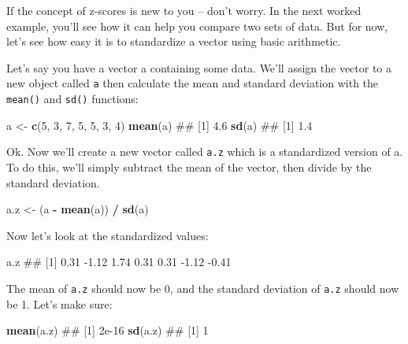 \documentclass[]{book}
\newenvironment{Shaded}{\begin{snugshade}}{\end{snugshade}}
\newcommand{\KeywordTok}[1]{\textcolor[rgb]{0.13,0.29,0.53}{\textbf{#1}}}
\newcommand{\DecValTok}[1]{\textcolor[rgb]{0.00,0.00,0.81}{#1}}
\newcommand{\StringTok}[1]{\textcolor[rgb]{0.31,0.60,0.02}{#1}}
\newcommand{\OperatorTok}[1]{\textcolor[rgb]{0.81,0.36,0.00}{\textbf{#1}}}
\newcommand{\NormalTok}[1]{#1}
\theoremstyle{definition}
\theoremstyle{definition}
\theoremstyle{remark}
\begin{document}
If the concept of z-scores is new to you -- don't worry. In the next
worked example, you'll see how it can help you compare two sets of data.
But for now, let's see how easy it is to standardize a vector using
basic arithmetic.

Let's say you have a vector a containing some data. We'll assign the
vector to a new object called \texttt{a} then calculate the mean and
standard deviation with the \texttt{mean()} and \texttt{sd()} functions:

\begin{Shaded}
\begin{Highlighting}[]
\NormalTok{a <-}\StringTok{ }\KeywordTok{c}\NormalTok{(}\DecValTok{5}\NormalTok{, }\DecValTok{3}\NormalTok{, }\DecValTok{7}\NormalTok{, }\DecValTok{5}\NormalTok{, }\DecValTok{5}\NormalTok{, }\DecValTok{3}\NormalTok{, }\DecValTok{4}\NormalTok{)}
\KeywordTok{mean}\NormalTok{(a)}
\NormalTok{## [1] 4.6}
\KeywordTok{sd}\NormalTok{(a)}
\NormalTok{## [1] 1.4}
\end{Highlighting}
\end{Shaded}

Ok. Now we'll create a new vector called \texttt{a.z} which is a
standardized version of a. To do this, we'll simply subtract the mean of
the vector, then divide by the standard deviation.

\begin{Shaded}
\begin{Highlighting}[]
\NormalTok{a.z <-}\StringTok{ }\NormalTok{(a }\OperatorTok{-}\StringTok{ }\KeywordTok{mean}\NormalTok{(a)) }\OperatorTok{/}\StringTok{ }\KeywordTok{sd}\NormalTok{(a)}
\end{Highlighting}
\end{Shaded}

Now let's look at the standardized values:

\begin{Shaded}
\begin{Highlighting}[]
\NormalTok{a.z}
\NormalTok{## [1]  0.31 -1.12  1.74  0.31  0.31 -1.12 -0.41}
\end{Highlighting}
\end{Shaded}

The mean of \texttt{a.z} should now be 0, and the standard deviation of
\texttt{a.z} should now be 1. Let's make sure:

\begin{Shaded}
\begin{Highlighting}[]
\KeywordTok{mean}\NormalTok{(a.z)}
\NormalTok{## [1] 2e-16}
\KeywordTok{sd}\NormalTok{(a.z)}
\NormalTok{## [1] 1}
\end{Highlighting}
\end{Shaded}
\end{document}
